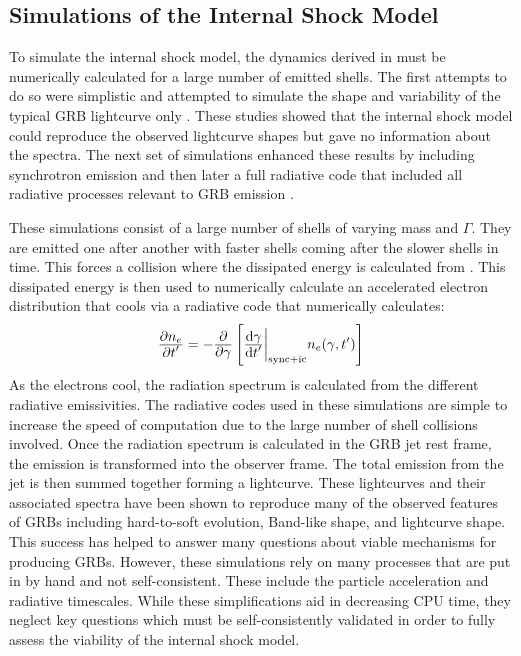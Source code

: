 \subsection{Simulations of the Internal Shock Model}
To simulate the internal shock model, the dynamics derived
in  must be numerically calculated for a large
number of emitted shells. The first attempts to do so were simplistic
and attempted to simulate the shape and variability of the typical GRB
lightcurve only \cite{Kobayashi:1997}. These studies showed that the
internal shock model could reproduce the observed lightcurve shapes
but gave no information about the spectra. The next set of simulations
enhanced these results by including synchrotron emission and then
later a full radiative code that included all radiative processes
relevant to GRB emission \cite{Daigne:1998,Daigne:2009}.

These simulations consist of a large number of shells of varying mass
and $\Gamma$. They are emitted one after another with faster shells
coming after the slower shells in time. This forces a collision where the
dissipated energy is calculated from . This
dissipated energy is then used to numerically calculate an accelerated
electron distribution that cools via a radiative code that
numerically calculates:
\begin{equation}
  \label{eq:coolingcode}
  \dover{\partial n_e}{\partial t^{\prime}}= - \dover{\partial}{\partial \gamma}\left[\dover{\mathrm{d}\gamma}{\mathrm{d} t^{\prime}}\bigg|_{{\rm sync} + {\rm ic}}n_e(\gamma,t^{\prime})\right]
\end{equation}
As the electrons cool, the radiation spectrum is calculated from the
different radiative emissivities. The radiative codes used in these
simulations are simple to increase the speed of computation due to
the large number of shell collisions involved. Once the radiation
spectrum is calculated in the GRB jet rest frame, the emission is
transformed into the observer frame. The total emission from the jet
is then summed together forming a lightcurve. These lightcurves and
their associated spectra have been shown to reproduce many of the
observed features of GRBs including hard-to-soft evolution, Band-like
shape, and lightcurve shape. This success has helped to answer many
questions about viable mechanisms for producing GRBs. However, these
simulations rely on many processes that are put in by hand and not
self-consistent. These include the particle acceleration and radiative
timescales. While these simplifications aid in decreasing CPU time,
they neglect key questions which must be self-consistently validated
in order to fully assess the viability of the internal shock model.

